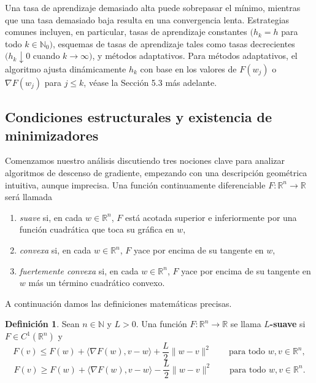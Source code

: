 \documentclass[11pt]{report}
\newenvironment{tcolorbox}[1][]{\par\medskip\noindent\ignorespaces}{\par\medskip}
\theoremstyle{definition}
\newtheorem{definicion}{Definición}[section]
\theoremstyle{plain}
\numberwithin{equation}{section}
\begin{document}
Una tasa de aprendizaje demasiado alta puede sobrepasar el mínimo, mientras que una tasa demasiado baja resulta en una convergencia lenta. Estrategias comunes incluyen, en particular, tasas de aprendizaje constantes \((h_k=h\) para todo \(k\in\mathbb{N}_0)\), esquemas de tasas de aprendizaje tales como tasas decrecientes \((h_k\downarrow 0\) cuando \(k\to\infty)\), y métodos adaptativos. Para métodos adaptativos, el algoritmo ajusta dinámicamente \(h_k\) con base en los valores de \(F(w_j)\) o \(\nabla F(w_j)\) para \(j\leq k\), véase la Sección 5.3 más adelante.

\subsection{Condiciones estructurales y existencia de minimizadores}

Comenzamos nuestro análisis discutiendo tres nociones clave para analizar algoritmos de descenso de gradiente, empezando con una descripción geométrica intuitiva, aunque imprecisa. Una función continuamente diferenciable \(F:\mathbb{R}^n\to\mathbb{R}\) será llamada

\begin{enumerate}
    \item[(i)] \textit{suave} si, en cada \(w\in\mathbb{R}^n\), \(F\) está acotada superior e inferiormente por una función cuadrática que toca su gráfica en \(w\),

    \item[(ii)] \textit{convexa} si, en cada \(w\in\mathbb{R}^n\), \(F\) yace por encima de su tangente en \(w\),

    \item[(iii)] \textit{fuertemente convexa} si, en cada \(w\in\mathbb{R}^n\), \(F\) yace por encima de su tangente en \(w\) más un término cuadrático convexo.
\end{enumerate}

A continuación damos las definiciones matemáticas precisas.

\begin{tcolorbox}[colback=blue!8, colframe=blue!8, boxrule=0pt]
\begin{definicion}
Sean \(n\in\mathbb{N}\) y \(L>0\). Una función \(F:\mathbb{R}^n\to\mathbb{R}\) se llama \textbf{\(L\)-suave} si \(F\in C^1(\mathbb{R}^n)\) y
\begin{equation*}
    F(v)
    \leq
    F(w)+\langle \nabla F(w),v-w\rangle
    +
    \frac{L}{2}\|w-v\|^2
    \qquad
    \text{para todo } w,v\in\mathbb{R}^n,
    \tag{5.1.4a}
\end{equation*}
\begin{equation*}
    F(v)
    \geq
    F(w)+\langle \nabla F(w),v-w\rangle
    -
    \frac{L}{2}\|w-v\|^2
    \qquad
    \text{para todo } w,v\in\mathbb{R}^n.
    \tag{5.1.4b}
\end{equation*}
\end{definicion}
\end{tcolorbox}
\end{document}
